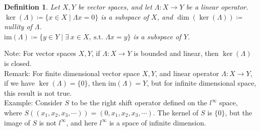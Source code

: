 \documentclass[11pt]{book}
\theoremstyle{break}
\theoremstyle{break}
\newtheorem{defn}{Definition}[corL]
\newcommand{\im}{\text{im}}
\newcommand{\note}{\color{red}Note: \color{black}}
\newcommand{\remark}{\color{blue}Remark: \color{black}}
\newcommand{\example}{\color{green}Example: \color{black}}
\begin{document}
\begin{defn}
Let $X,Y$ be vector spaces, and let $\Lambda:X \to Y$ be a linear operator.\\
$\ker(\Lambda) \coloneqq \{x \in X \mid \Lambda x = 0\}$ is a subspace of $X$, and
$\dim(\ker(\Lambda)) \coloneqq $ nullity of $\Lambda$.\\
$\text{im}(\Lambda) \coloneqq \{y \in Y \mid \exists\ x \in X ,\ \text{s.t. }\Lambda x = y\}$ is a subspace of $Y$. 
\end{defn}
\note For vector spaces $X,Y$, if $\Lambda:X \to Y$ is bounded and linear, then $\ker(\Lambda)$ is closed. \\

\remark For finite dimensional vector space $X,Y$, and linear operator $\Lambda:X \to Y$, if we have $\ker(\Lambda) = \{0\}$, then $\im(\Lambda) = Y$, but for infinite dimensional space, this result is not true. \\


\example Consider $S$ to be the right shift operator defined on the $l^{\infty}$ space, where $S((x_1,x_2,x_3,\cdots)) = (0,x_1,x_2,x_3,\cdots)$. The kernel of $S$ is $\{0\}$, but the image of $S$ is not $l^\infty$, and here $l^\infty$ is a space of infinite dimension.\\
\end{document}
